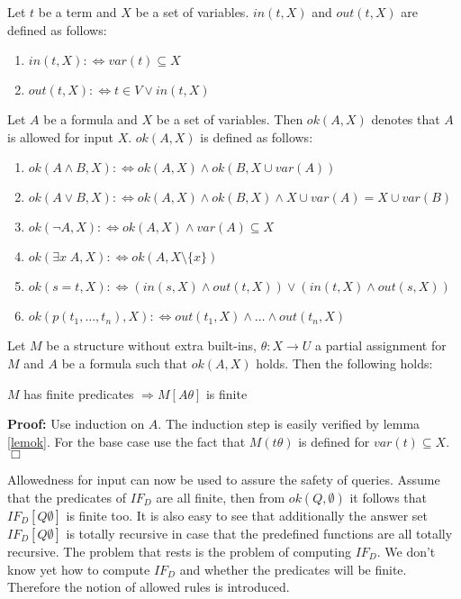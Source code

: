 \begin{Def} 
\label{definout}
Let $t$ be a term and $X$ be a set of variables. $in(t,X)$ and $out(t,X)$ 
are defined as follows:
\begin{enumerate}
\item $in(t,X) :\Longleftrightarrow var(t) \subseteq X$
\item $out(t,X) :\Longleftrightarrow t\in V \vee in(t,X)$
\end{enumerate}
\end{Def}

\begin{Def}
\label{defok}
Let $A$ be a formula and $X$ be a set of variables. Then $ok(A,X)$ denotes that $A$ is
allowed for input $X$. $ok(A,X)$ is defined as follows:

\begin{enumerate}
\item $ok(A \wedge B,X) :\Longleftrightarrow ok(A,X) \wedge ok(B,X \cup var(A))$
\item $ok(A \vee B,X) :\Longleftrightarrow ok(A,X) \wedge ok(B,X) \wedge X\cup var(A)=X \cup var(B)$
\item $ok(\neg A,X) :\Longleftrightarrow ok(A,X) \wedge var(A)\subseteq X$
\item $ok(\exists x\;A,X) :\Longleftrightarrow ok(A,X\setminus \{x\})$
\item $ok(s=t,X) :\Longleftrightarrow (in(s,X)\wedge out(t,X))\vee(in(t,X)\wedge out(s,X))$
\item $ok(p(t_1,\ldots,t_n),X) :\Longleftrightarrow out(t_1,X) \wedge \ldots \wedge out(t_n,X)$
\end{enumerate}
\end{Def}

\begin{Pro} 
\label{prook}
Let $M$ be a structure without extra built-ins, $\theta:X\rightarrow U$ a partial assignment 
for $M$ and $A$ be a formula such that $ok(A,X)$ holds. Then the following holds:

\begin{center}
$M$ has finite predicates $\Longrightarrow M[A\theta]$ is finite
\end{center}
\end{Pro}

{\bf Proof:} Use induction on $A$. The induction step is easily verified by lemma \ref{lemok}.
For the base case use the fact that $M(t\theta)$ is defined for $var(t)\subseteq X$. \hfill $\Box$

Allowedness for input can now be used to assure the safety of queries. Assume that the predicates
of $IF_D$ are all finite, then from $ok(Q,\emptyset)$ it follows that $IF_D[Q\emptyset]$ is finite 
too. It is also easy to see that additionally the answer set $IF_D[Q\emptyset]$ is totally 
recursive in case that the predefined functions are all totally recursive. The problem that
rests is the problem of computing $IF_D$. We don't know yet how to compute $IF_D$ and whether
the predicates will be finite. Therefore the notion of allowed rules is introduced.

